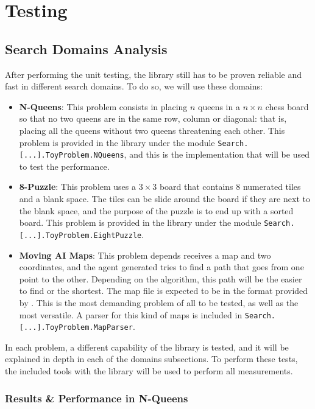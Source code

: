 \section{Testing}

\subsection{Search Domains Analysis}

After performing the unit testing, the library still has to be proven reliable
and fast in different search domains. To do so, we will use these domains:

\begin{itemize}
\item \textbf{N-Queens}: This problem consists in placing $n$ queens in a $n
  \times n$ chess board so that no two queens are in the same row, column or
  diagonal: that is, placing all the queens without two queens threatening each
  other. This problem is provided in the library under the module
  \texttt{Search.[...].ToyProblem.NQueens}, and this is the implementation that will
  be used to test the performance.
\item \textbf{8-Puzzle}: This problem uses a $3 \times 3$ board that contains 8
  numerated tiles and a blank space. The tiles can be slide around the board if
  they are next to the blank space, and the purpose of the puzzle is to end up
  with a sorted board. This problem is provided in the library under the module
  \texttt{Search.[...].ToyProblem.EightPuzzle}.
\item \textbf{Moving AI Maps}: This problem depends receives a map and two
  coordinates, and the agent generated tries to find a path that goes from one
  point to the other. Depending on the algorithm, this path will be the easier
  to find or the shortest. The map file is expected to be in the format
  provided by \cite{movingai-benchmarks}. This is the most demanding problem of
  all to be tested, as well as the most versatile. A parser for this kind of
  maps is included in \texttt{Search.[...].ToyProblem.MapParser}.
\end{itemize}

In each problem, a different capability of the library is tested, and it will
be explained in depth in each of the domains subsections. To perform these
tests, the included tools with the library will be used to perform all
measurements.\\

\subsubsection{Results \& Performance in N-Queens}


